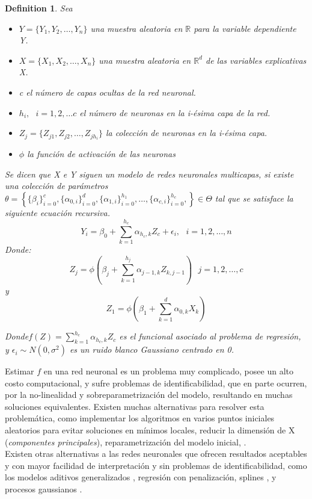 \documentclass[nojss]{jss}
\newtheorem{Def}{Definition}
\begin{document}
\begin{Def}
	Sea
	\begin{itemize}
		\item $Y = \{Y_1,Y_2,\ldots,Y_n\}$ una muestra aleatoria en $\mathbb{R}$ para la variable dependiente Y.
		\item $X = \{X_1,X_2,\ldots,X_n\}$ una muestra aleatoria en $\mathbb{R}^d$ de las variables explicativas X.
		\item  c el número de capas ocultas de la red neuronal.
		\item $h_i,\text{ } i = 1,2,\ldots c$ el número de neuronas  en la i-ésima capa de la red.
		\item $Z_j = \{Z_{j1},Z_{j2},\ldots, Z_{jh_i}\}$ la colección de neuronas en la i-ésima capa.
		\item $\phi$ la función de activación de las neuronas
	\end{itemize}
	 
	Se dicen que X e Y siguen un modelo de redes neuronales multicapas, si existe una colección de parámetros $\theta = \left\{ \{\beta_i\}_{i=0}^{c},\{\alpha_{0,i}\}_{i=0}^{d},\{\alpha_{1,i}\}_{i=0}^{h_1},\ldots, \{\alpha_{c,i}\}_{i=0}^{h_c}, \right\} \in \Theta$ tal que se satisface la siguiente ecuación recursiva.
	$$Y_i = \beta_{0} + \sum_{k=1}^{h_c} \alpha_{h_c,k} Z_c +\epsilon_i, \text{ } i = 1,2,\ldots,n$$
	Donde: 
	$$Z_{j} = \phi\left(\beta_j +\sum_{k=1}^{h_j}\alpha_{j-1,k}Z_{k,j-1}\right)\text{ } j = 1,2,\ldots,c$$
	y 
	$$Z_{1} = \phi\left(\beta_1 +\sum_{k=1}^{d}\alpha_{0,k}X_{k}\right) $$
	
	Donde$f(Z) = \sum_{k=1}^{h_c} \alpha_{h_c,k} Z_c$ es el funcional asociado al problema de regresión, y  $\epsilon_i \sim N(0,\sigma^2)$ es un ruido blanco Gaussiano centrado en 0.
\end{Def}

Estimar $f$ en una red neuronal es un problema muy complicado, posee un alto costo computacional, y sufre problemas de identificabilidad, que en parte ocurren, por la no-linealidad y sobreparametrización del modelo, resultando en muchas soluciones equivalentes. Existen muchas alternativas para resolver esta problemática, como implementar los algoritmos en varios puntos iniciales aleatorios para evitar soluciones en mínimos locales, reducir la dimensión de X (\textit{componentes principales}), reparametrización del modelo inicial, \cite{Arya2017}.\\

Existen otras alternativas a las redes neuronales que ofrecen resultados aceptables y con mayor facilidad de interpretación y sin problemas de identificabilidad, como los modelos aditivos generalizados \cite{Rigby2005}, regresión con penalización, splines \cite{Silverman1985}, y procesos gaussianos \cite{gramacy2020surrogates}.  
 
\end{document}
